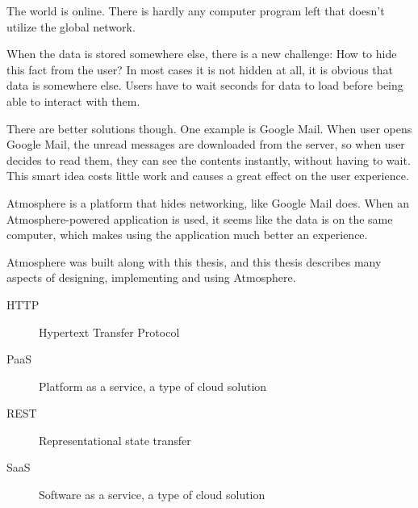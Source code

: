 \documentclass[]{tukethesis}
\begin{document}
\preface %
The world is online. There is hardly any computer program left that doesn’t utilize the global network. 

When the data is stored somewhere else, there is a new challenge: How to hide this fact from the user? In most cases it is not hidden at all, it is obvious that data is somewhere else. Users have to wait seconds for data to load before being able to interact with them.

There are better solutions though. One example is Google Mail. When user opens Google Mail, the unread messages are downloaded from the server, so when user decides to read them, they can see the contents instantly, without having to wait. This smart idea costs little work and causes a great effect on the user experience.

Atmosphere is a platform that hides networking, like Google Mail does. When an Atmosphere-powered application is used, it seems like the data is on the same computer, which makes using the application much better an experience.

Atmosphere was built along with this thesis, and this thesis describes many aspects of designing, implementing and using Atmosphere.
\endpreface

\thispagestyle{empty}
\tableofcontents
\newpage

\thispagestyle{empty}
\listoffigures
\newpage

\thispagestyle{empty}
\listoftables
\newpage


\listofterms %

\begin{description}
\item[HTTP] Hypertext Transfer Protocol
\item[PaaS] Platform as a service, a type of cloud solution
\item[REST] Representational state transfer
\item[SaaS] Software as a service, a type of cloud solution
\end{description}

\setlength{\parindent}{1cm} 
\setlength{\parskip}{0cm}
\end{document}
